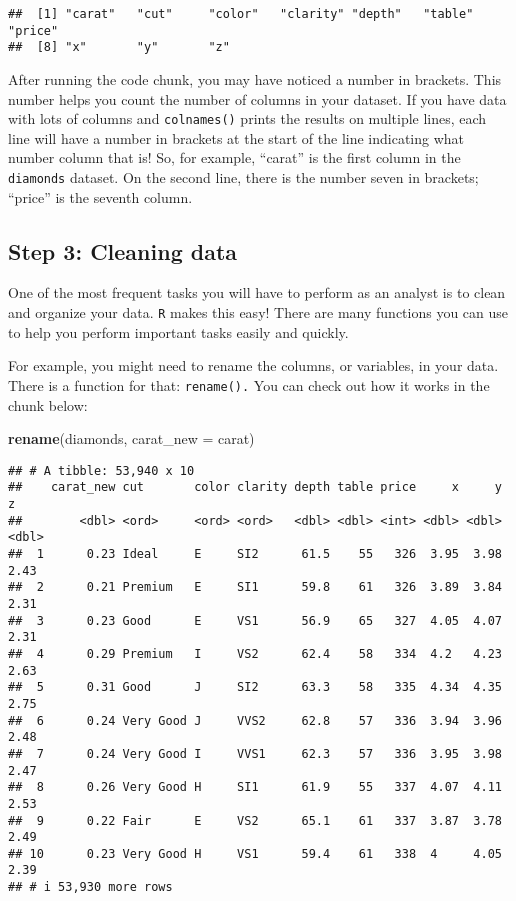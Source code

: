 \documentclass[
]{article}
\newenvironment{Shaded}{\begin{snugshade}}{\end{snugshade}}
\newcommand{\AttributeTok}[1]{\textcolor[rgb]{0.13,0.29,0.53}{#1}}
\newcommand{\FunctionTok}[1]{\textcolor[rgb]{0.13,0.29,0.53}{\textbf{#1}}}
\newcommand{\NormalTok}[1]{#1}
\begin{document}
\begin{verbatim}
##  [1] "carat"   "cut"     "color"   "clarity" "depth"   "table"   "price"  
##  [8] "x"       "y"       "z"
\end{verbatim}

After running the code chunk, you may have noticed a number in brackets.
This number helps you count the number of columns in your dataset. If
you have data with lots of columns and \texttt{colnames()} prints the
results on multiple lines, each line will have a number in brackets at
the start of the line indicating what number column that is! So, for
example, ``carat'' is the first column in the \texttt{diamonds} dataset.
On the second line, there is the number seven in brackets; ``price'' is
the seventh column.

\hypertarget{step-3-cleaning-data}{%
\subsection{Step 3: Cleaning data}\label{step-3-cleaning-data}}

One of the most frequent tasks you will have to perform as an analyst is
to clean and organize your data. \texttt{R} makes this easy! There are
many functions you can use to help you perform important tasks easily
and quickly.

For example, you might need to rename the columns, or variables, in your
data. There is a function for that: \texttt{rename().} You can check out
how it works in the chunk below:

\begin{Shaded}
\begin{Highlighting}[]
\FunctionTok{rename}\NormalTok{(diamonds, }\AttributeTok{carat\_new =}\NormalTok{ carat)}
\end{Highlighting}
\end{Shaded}

\begin{verbatim}
## # A tibble: 53,940 x 10
##    carat_new cut       color clarity depth table price     x     y     z
##        <dbl> <ord>     <ord> <ord>   <dbl> <dbl> <int> <dbl> <dbl> <dbl>
##  1      0.23 Ideal     E     SI2      61.5    55   326  3.95  3.98  2.43
##  2      0.21 Premium   E     SI1      59.8    61   326  3.89  3.84  2.31
##  3      0.23 Good      E     VS1      56.9    65   327  4.05  4.07  2.31
##  4      0.29 Premium   I     VS2      62.4    58   334  4.2   4.23  2.63
##  5      0.31 Good      J     SI2      63.3    58   335  4.34  4.35  2.75
##  6      0.24 Very Good J     VVS2     62.8    57   336  3.94  3.96  2.48
##  7      0.24 Very Good I     VVS1     62.3    57   336  3.95  3.98  2.47
##  8      0.26 Very Good H     SI1      61.9    55   337  4.07  4.11  2.53
##  9      0.22 Fair      E     VS2      65.1    61   337  3.87  3.78  2.49
## 10      0.23 Very Good H     VS1      59.4    61   338  4     4.05  2.39
## # i 53,930 more rows
\end{verbatim}
\end{document}
